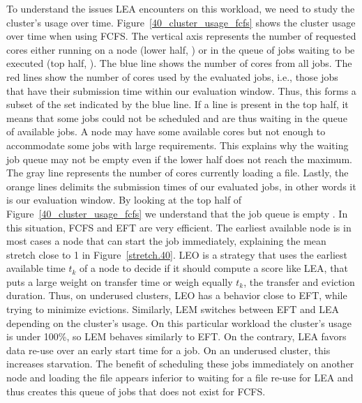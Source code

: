 \documentclass[sigconf,review,anonymous]{acmart}
\newcommand{\rev}[1]{{\color{blue}{#1}}}
\begin{document}
To understand the issues LEA encounters on this workload, we need to study the cluster's usage over time.
Figure~\ref{40_cluster_usage_fcfs} shows the cluster usage over time when using FCFS.
The vertical axis represents the number of requested cores either running on a
node (lower half, \rev{here the maximum is the total number of cores on our cluster: 9720}) or in the queue of jobs waiting to be executed (top
half, \rev{here the number of requested cores can be much higher than the cluster's capability}).
The blue line shows the number of cores from all jobs.
The red lines show the number of cores used by the evaluated jobs, i.e.,
those jobs that have their submission time within our evaluation window. Thus, this forms a subset
of the set indicated by the blue line.
If a line is present in the top half, it means that some jobs could not be scheduled
and are thus waiting in the queue of available jobs. 
A node may have some available cores but not enough to accommodate some jobs with large requirements.
This explains why the waiting job queue may not be empty even if the lower half does not reach the maximum.
The gray line represents the number of cores currently loading a file.
Lastly, the orange lines delimits the submission times of our 
evaluated jobs, in other words it is our evaluation window.
By looking at the top half of Figure~\ref{40_cluster_usage_fcfs}
we understand that the job queue is empty \rev{for more than half of the evaluation window}.
In this situation, FCFS and EFT are very efficient. The earliest available node is in
most cases a node that can start the job immediately, explaining the mean stretch close to 1 in Figure~\ref{stretch.40}.
LEO is a strategy that uses the earliest available time $t_k$ of a node to decide if it should compute a score like LEA,
that puts a large weight on transfer time
or weigh equally $t_k$, the transfer and eviction duration. 
Thus, on underused clusters, LEO has a behavior close to EFT, while trying to minimize evictions.
Similarly, LEM switches between EFT and LEA depending on the cluster's usage.
On this particular workload the cluster's usage is under 100\%, so LEM behaves similarly to EFT.
On the contrary, LEA favors data re-use over an early start time for a job.
On an underused cluster, this increases starvation.
\rev{LEA, will create a queue of jobs that already have a valid copy of their file loaded on a node.}
The benefit of scheduling these jobs immediately on another node and loading the file appears
inferior to waiting for a file re-use for LEA and thus creates this queue of jobs that does not exist for FCFS. 
\end{document}
